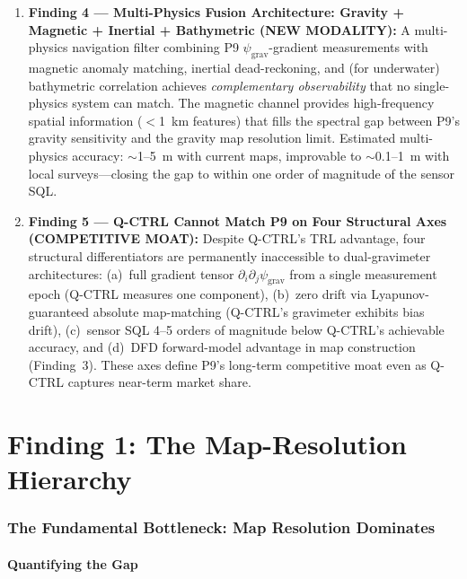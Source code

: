 \documentclass[11pt]{article}
\theoremstyle{definition}
\theoremstyle{remark}
\newcommand{\psigrav}{\psi_{\mathrm{grav}}}
\begin{document}
\begin{enumerate}
\item \textbf{Finding 4 --- Multi-Physics Fusion Architecture:
  Gravity + Magnetic + Inertial + Bathymetric (NEW MODALITY):} A
  multi-physics navigation filter combining P9 $\psigrav$-gradient
  measurements with magnetic anomaly matching, inertial dead-reckoning,
  and (for underwater) bathymetric correlation achieves \emph{complementary
  observability} that no single-physics system can match. The magnetic
  channel provides high-frequency spatial information ($<$1~km features)
  that fills the spectral gap between P9's gravity sensitivity and the
  gravity map resolution limit. Estimated multi-physics accuracy:
  $\sim$1--5~m with current maps, improvable to $\sim$0.1--1~m with
  local surveys---closing the gap to within one order of magnitude of
  the sensor SQL.

\item \textbf{Finding 5 --- Q-CTRL Cannot Match P9 on Four Structural
  Axes (COMPETITIVE MOAT):} Despite Q-CTRL's TRL advantage,
  four structural differentiators are permanently inaccessible to
  dual-gravimeter architectures: (a)~full gradient tensor
  $\partial_i\partial_j\psigrav$ from a single measurement epoch
  (Q-CTRL measures one component), (b)~zero drift via Lyapunov-guaranteed
  absolute map-matching (Q-CTRL's gravimeter exhibits bias drift),
  (c)~sensor SQL 4--5 orders of magnitude below Q-CTRL's achievable
  accuracy, and (d)~DFD forward-model advantage in map construction
  (Finding~3). These axes define P9's long-term competitive moat even
  as Q-CTRL captures near-term market share.
\end{enumerate}

\part{Finding 1: The Map-Resolution Hierarchy}
\label{part:map-hierarchy}

\section{The Fundamental Bottleneck: Map Resolution Dominates}
\label{sec:map-bottleneck}

\subsection{Quantifying the Gap}
\end{document}
